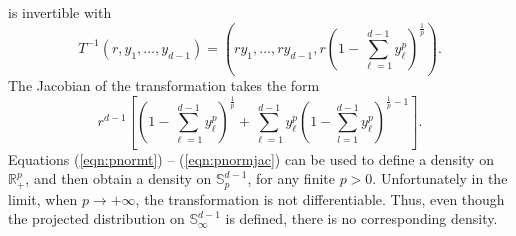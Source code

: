   is invertible with
  \begin{equation}
    \label{eqn:pnormtinv}
    T^{-1}\left(r,y_1,\ldots,y_{d-1}\right) =
      \left(ry_1,\ldots,ry_{d-1}, r\left(1 - {\textstyle\sum}_{\ell = 1}^{d-1}y_{\ell}^p\right)^{\frac{1}{p}}\right).
  \end{equation}
  The Jacobian of the transformation takes the form
  \begin{equation}
    \label{eqn:pnormjac}
    r^{d-1}\left[\left(1 - {\textstyle\sum}_{\ell = 1}^{d-1}y_{\ell}^p\right)^{\frac{1}{p}} +
        {\textstyle\sum}_{\ell = 1}^{d-1}y_{\ell}^p\left(1 - {\textstyle\sum}_{l=1}^{d-1} y_{\ell}^p\right)^{\frac{1}{p} - 1}\right].
  \end{equation}
  Equations (\ref{eqn:pnormt}) -- (\ref{eqn:pnormjac}) can be used to define a density on ${\mathbb R}^p_+$, and then obtain a density on ${\mathbb S}_{p}^{d-1}$, for any finite $p>0$. Unfortunately in the limit, when $p\rightarrow +\infty$, the transformation is not differentiable. Thus, even though the projected distribution on ${\mathbb S}_\infty^{d-1}$ is defined, there is no corresponding density.
  
